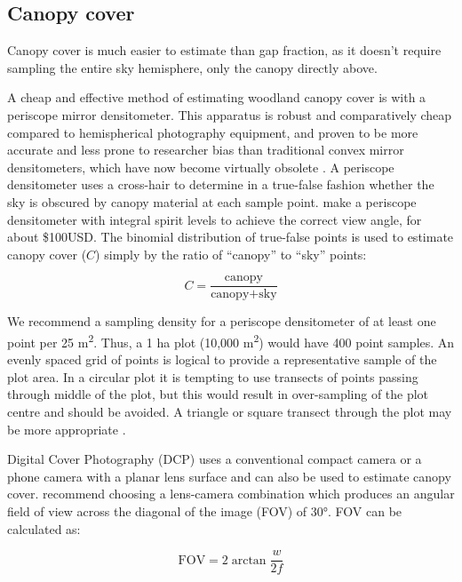 \documentclass[11pt,a4paper]{article}
\begin{document}
\subsection{Canopy cover}

Canopy cover is much easier to estimate than gap fraction, as it doesn't require sampling the entire sky hemisphere, only the canopy directly above.

A cheap and effective method of estimating woodland canopy cover is with a periscope mirror densitometer. This apparatus is robust and comparatively cheap compared to hemispherical photography equipment, and proven to be more accurate and less prone to researcher bias than traditional convex mirror densitometers, which have now become virtually obsolete \citep{Seidel2011}. A periscope densitometer uses a cross-hair to determine in a true-false fashion whether the sky is obscured by canopy material at each sample point. \citet{GRS} make a periscope densitometer with integral spirit levels to achieve the correct view angle, for about \$100USD. The binomial distribution of true-false points is used to estimate canopy cover ($C$) simply by the ratio of ``canopy'' to ``sky'' points:

\begin{equation}
	C = \frac{\text{canopy}}{\text{canopy} + \text{sky}}
\end{equation}



We recommend a sampling density for a periscope densitometer of at least one point per 25 m\textsuperscript{2}. Thus, a 1 ha plot (10,000 m\textsuperscript{2}) would have 400 point samples. An evenly spaced grid of points is logical to provide a representative sample of the plot area. In a circular plot it is tempting to use transects of points passing through middle of the plot, but this would result in over-sampling of the plot centre and should be avoided. A triangle or square transect through the plot may be more appropriate \citep{Stumpf1993}.

Digital Cover Photography (DCP) uses a conventional compact camera or a phone camera with a planar lens surface and can also be used to estimate canopy cover. \citet{Macfarlane2007} recommend choosing a lens-camera combination which produces an angular field of view across the diagonal of the image (FOV) of \textapprox{}30\si{\degree}. FOV can be calculated as:

\begin{equation}
	\text{FOV} = 2\arctan\frac{w}{2f}
\end{equation}
\end{document}
